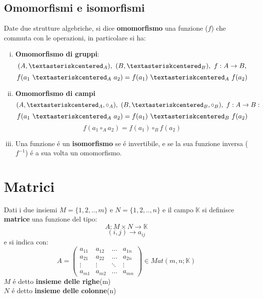 \documentclass{article}
\begin{document}
\subsection{Omomorfismi e isomorfismi}
Date due strutture algebriche, si dice \textbf{omomorfismo} una funzione ($f$)
che commuta con le operazioni, in particolare si ha:
\begin{enumerate}[i.]
	\item \textbf{Omomorfismo di gruppi}:
	      \[
		      (A, \textasteriskcentered_{A}),\ (B, \textasteriskcentered _{B}), \ f: A \to B,
	      \]
	      \[
		      f(a_1 \ \textasteriskcentered_A \ a_2) = f(a_1) \ \textasteriskcentered_A \ f(a_2)
	      \]
	\item \textbf{Omomorfismo di campi}
	      \[
		      (A, \textasteriskcentered_{A}, \circ_A),\ (B, \textasteriskcentered _{B}, \circ_B),  \ f: A \to B:
	      \]
	      \[
		      f(a_1 \ \textasteriskcentered_A \ a_2) = f(a_1) \ \textasteriskcentered_B \ f(a_2)
	      \]
	      \[
		      f(a_1 \circ_A a_2) = f(a_1) \circ_B f(a_2)
	      \]
	\item Una funzione é un \textbf{isomorfismo} se é invertibile, e se la sua funzione
	      inversa ($f^{ -1}$) é a sua volta un omomorfismo.
\end{enumerate}
\section{Matrici}
Dati i due insiemi $M=\{1, 2,..,m\}$ e $N=\{1, 2,..,n\}$ e il campo
$\mathbb{K}$ si definisce \textbf{matrice} una funzione del tipo:
\[
	A: M \times N \to \mathbb{K}
\]
\[
	(i , j) \to a_{ij}
\]
e si indica con:
\[
	A=
	\begin{pmatrix}
		a_{11} & a_{12} & \dots  & a_{1n} \\
		a_{21} & a_{22} & \dots  & a_{2n} \\
		\vdots & \vdots & \ddots & \vdots \\
		a_{m1} & a_{m2} & \dots  & a_{mn}
	\end{pmatrix}
	\in Mat(m,n;\mathbb{K})
\]
$M$ é detto \textbf{insieme delle righe}(m)\\
$N$ é detto \textbf{insieme delle colonne}(n)
\end{document}

